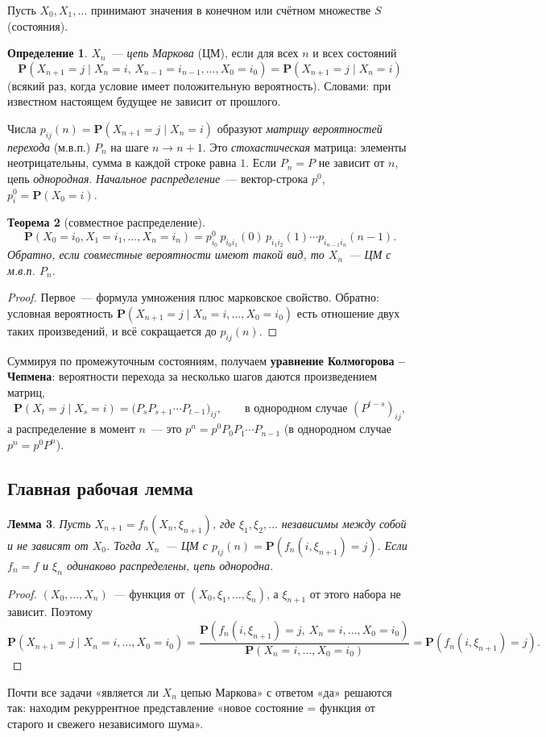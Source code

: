 \documentclass[11pt,a4paper]{article}
\newtheorem{thm}{Теорема}[section]
\newtheorem{lem}[thm]{Лемма}
\theoremstyle{definition}
\newtheorem{defn}[thm]{Определение}
\newcommand{\PP}{\mathbf P}
\newcommand{\1}{\mathbf 1}
\begin{document}
Пусть $X_0,X_1,\dots$ принимают значения в конечном или счётном множестве $S$
(состояния).

\begin{defn}
$X_n$~--- \emph{цепь Маркова} (ЦМ), если для всех $n$ и всех состояний
\[
\PP(X_{n+1}=j\mid X_n=i,\,X_{n-1}=i_{n-1},\dots,X_0=i_0)=\PP(X_{n+1}=j\mid X_n=i)
\]
(всякий раз, когда условие имеет положительную вероятность). Словами: при
известном настоящем будущее не зависит от прошлого.
\end{defn}

Числа $p_{ij}(n)=\PP(X_{n+1}=j\mid X_n=i)$ образуют \emph{матрицу вероятностей
перехода} (м.в.п.) $P_n$ на шаге $n\to n+1$. Это \emph{стохастическая}
матрица: элементы неотрицательны, сумма в каждой строке равна $1$. Если $P_n=P$
не зависит от $n$, цепь \emph{однородная}. \emph{Начальное распределение}~---
вектор-строка $p^0$, $p^0_i=\PP(X_0=i)$.

\begin{thm}[совместное распределение]
\[
\PP(X_0=i_0,X_1=i_1,\dots,X_n=i_n)=p^0_{i_0}\,p_{i_0i_1}(0)\,p_{i_1i_2}(1)\cdots p_{i_{n-1}i_n}(n-1).
\]
Обратно, если совместные вероятности имеют такой вид, то $X_n$~--- ЦМ с м.в.п.
$P_n$.
\end{thm}
\begin{proof}
Первое~--- формула умножения плюс марковское свойство. Обратно: условная
вероятность
$\PP(X_{n+1}=j\mid X_n=i,\dots,X_0=i_0)$ есть отношение двух таких
произведений, и всё сокращается до $p_{ij}(n)$.
\end{proof}

Суммируя по промежуточным состояниям, получаем \textbf{уравнение
Колмогорова -- Чепмена}: вероятности перехода за несколько шагов даются
произведением матриц,
\[
\PP(X_t=j\mid X_s=i)=\bigl(P_sP_{s+1}\cdots P_{t-1}\bigr)_{ij},
\qquad\text{в однородном случае }(P^{t-s})_{ij},
\]
а распределение в момент $n$~--- это $p^n=p^0P_0P_1\cdots P_{n-1}$ (в однородном
случае $p^n=p^0P^n$).

\subsection{Главная рабочая лемма}

\begin{lem}\label{lem:rec}
Пусть $X_{n+1}=f_n(X_n,\xi_{n+1})$, где $\xi_1,\xi_2,\dots$ независимы между
собой и не зависят от $X_0$. Тогда $X_n$~--- ЦМ с
$p_{ij}(n)=\PP(f_n(i,\xi_{n+1})=j)$. Если $f_n=f$ и $\xi_n$ одинаково
распределены, цепь однородна.
\end{lem}
\begin{proof}
$(X_0,\dots,X_n)$~--- функция от $(X_0,\xi_1,\dots,\xi_n)$, а $\xi_{n+1}$ от
этого набора не зависит. Поэтому
\[
\PP(X_{n+1}=j\mid X_n=i,\dots,X_0=i_0)=
\frac{\PP(f_n(i,\xi_{n+1})=j,\ X_n=i,\dots,X_0=i_0)}{\PP(X_n=i,\dots,X_0=i_0)}
=\PP(f_n(i,\xi_{n+1})=j).
\]
\end{proof}
Почти все задачи «является ли $X_n$ цепью Маркова» с ответом «да» решаются так:
находим рекуррентное представление «новое состояние = функция от старого и
свежего независимого шума».
\end{document}
